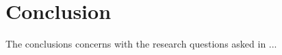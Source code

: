 
\chapter{Conclusion}\label{sec:conclusion}
The conclusions concerns with the research questions asked in ...




